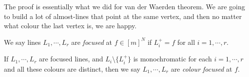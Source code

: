 \documentclass[a4paper]{article}
\begin{document}
The proof is essentially what we did for van der Waerden theorem. We are going to build a lot of almost-lines that point at the same vertex, and then no matter what colour the last vertex is, we are happy.

\begin{defi}
  We say lines $L_1, \cdots, L_r$ are \emph{focused} at $f \in [m]^N$ if $L_i^+ = f$ for all $i = 1, \cdots, r$.
\end{defi}

\begin{defi}
  If $L_1, \cdots, L_r$ are focused lines, and $L_i \setminus \{L_i^+\}$ is monochromatic for each $i = 1, \cdots, r$ and all these colours are distinct, then we say $L_1, \cdots, L_r$ are \emph{colour focused} at $f$.
\end{defi}
\end{document}
